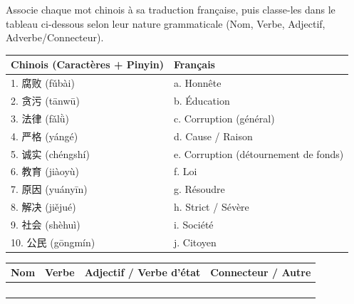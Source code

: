 \documentclass[11pt]{article}
\begin{document}
\begin{exercice}
Associe chaque mot chinois à sa traduction française, puis classe-les dans le tableau ci-dessous selon leur nature grammaticale (Nom, Verbe, Adjectif, Adverbe/Connecteur).

\begin{center}
\begin{tabularx}{\linewidth}{|X|X|}\hline
\rowcolor{popblueL} \textbf{Chinois (Caractères + Pinyin)} & \textbf{Français} \\ \hline
1. 腐败 (fǔbài) & a. Honnête \\ \hline
2. 贪污 (tānwū) & b. Éducation \\ \hline
3. 法律 (fǎlǜ) & c. Corruption (général) \\ \hline
4. 严格 (yángé) & d. Cause / Raison \\ \hline
5. 诚实 (chéngshí) & e. Corruption (détournement de fonds) \\ \hline
6. 教育 (jiàoyù) & f. Loi \\ \hline
7. 原因 (yuányīn) & g. Résoudre \\ \hline
8. 解决 (jiějué) & h. Strict / Sévère \\ \hline
9. 社会 (shèhuì) & i. Société \\ \hline
10. 公民 (gōngmín) & j. Citoyen \\ \hline
\end{tabularx}
\end{center}

\begin{center}
\begin{tabularx}{\linewidth}{|X|X|X|X|}\hline
\rowcolor{popblueL} \textbf{Nom} & \textbf{Verbe} & \textbf{Adjectif / Verbe d'état} & \textbf{Connecteur / Autre} \\ \hline
 &  &  &  \\ \hline
 &  &  &  \\ \hline
 &  &  &  \\ \hline
 &  &  &  \\ \hline
\end{tabularx}
\end{center}
\end{exercice}
\end{document}
